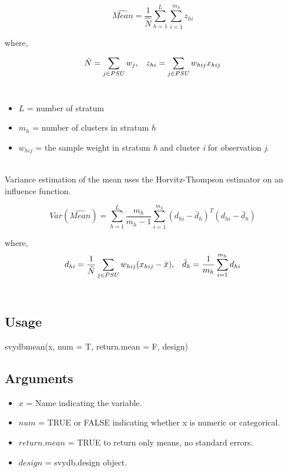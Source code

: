 $$ \hat{Mean} = \frac{1}{\hat{N}} \sum_{h = 1}^{L} \sum_{i = 1}^{m_h} z_{hi}$$

where,

$$\hat{N} = \sum_{j \in PSU} w_j \text{,\quad} z_{hi} = \sum_{j \in PSU} w_{hij} x_{hij}$$
\\
\begin{itemize}
\item $L$ = number of stratum

\item $m_h$ = number of clusters in stratum $h$

\item $w_{hij}$ = the sample weight in stratum {\emph h} and cluster {\emph i} for observation {\emph j}.
\end{itemize}
\\
Variance estimation of the mean uses the Horvitz-Thompson estimator on an influence function.

$$Var(\hat{Mean}) =  \sum_{h = 1}^{L} \frac{m_h}{m_h - 1} 
                    \sum_{i = 1}^{m_h} (d_{hi} - \bar{d}_h)^T (d_{hi} - \bar{d}_h)$$

where,
$$d_{hi} = \frac{1}{\hat{N}} \sum_{j \in PSU} w_{hij}(x_{hij} - \bar{x}) 
\text{,\quad} 
\bar{d}_h = \frac{1}{m_h} \sum_{i = 1}^{m_h} d_{hi}$$
\\

\subsection{Usage}
\begin{center}
    {\ttfamily svydbmean(x, num = T, return.mean = F, design)}
\end{center}
\subsection{Arguments}
\begin{itemize}
\item $x$ = Name indicating the variable.

\item $num$ = {\ttfamily TRUE} or {\ttfamily FALSE} indicating whether x is numeric or categorical.

\item $return.mean$ = {\ttfamily TRUE} to return only means, no standard errors.

\item $design$ = svydb.design object.
\end{itemize}

